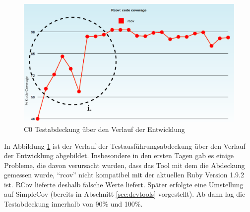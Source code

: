 \begin{figure}[htbp]
 \centering
 \includegraphics[width=\textwidth]{./diagrams/itjobs-coverage.pdf}
 \caption{C0 Testabdeckung über den Verlauf der Entwicklung}
 \label{fig:itjobsCoverage}
\end{figure}
In Abbildung \ref{fig:itjobsCoverage} ist der Verlauf der Testausführungsabdeckung über den Verlauf der Entwicklung abgebildet. Insbesondere in den ersten Tagen gab es einige Probleme, die davon verursacht wurden, dass das Tool mit dem die Abdeckung gemessen wurde, "`rcov"' nicht kompatibel mit der aktuellen Ruby Version 1.9.2 ist. RCov lieferte deshalb falsche Werte liefert. Später erfolgte eine Umstellung auf SimpleCov (bereits in Abschnitt \ref{sec:devtools} vorgestellt). Ab dann lag die Testabdeckung innerhalb von 90\% und 100\%.



